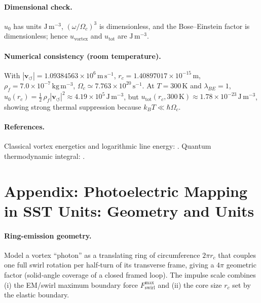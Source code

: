 \documentclass[10pt,reprint,aps,onecolumn,nofootinbib]{revtex4-2}
\begin{document}
    \paragraph{Dimensional check.}
        \(u_0\) has units \(\mathrm{J\,m^{-3}}\),
        \((\omega/\Omega_c)^3\) is dimensionless, and the Bose–Einstein factor is dimensionless; hence \(u_{\mathrm{vortex}}\) and \(u_{\mathrm{tot}}\) are \(\mathrm{J\,m^{-3}}\).

    \paragraph{Numerical consistency (room temperature).}
        With \(|\mathbf{v}_{\!\boldsymbol{\circlearrowleft}}|=1.09384563\times10^{6}\,\mathrm{m\,s^{-1}}\),
        \(r_c=1.40897017\times10^{-15}\,\mathrm{m}\),
        \(\rho_{\!f}=7.0\times10^{-7}\,\mathrm{kg\,m^{-3}}\),
        \(\Omega_c\simeq 7.763\times10^{20}\,\mathrm{s^{-1}}\).
        At \(T=300\,\mathrm{K}\) and \(\lambda_{\!BE}=1\),
        \(u_0(r_c)=\tfrac12\,\rho_{\!f}|\mathbf{v}_{\!\boldsymbol{\circlearrowleft}}|^{2}\approx 4.19\times10^{5}\,\mathrm{J\,m^{-3}}\),
        but \(u_{\mathrm{tot}}(r_c,300\,\mathrm{K})\approx 1.78\times10^{-23}\,\mathrm{J\,m^{-3}}\),
        showing strong thermal suppression because \(k_B T\ll \hbar\Omega_c\).

    \paragraph{References.}
        Classical vortex energetics and logarithmic line energy:
        \cite{Saffman1992,Batchelor1967,LandauFM}.
        Quantum thermodynamic integral: \cite{Planck1901}.


\section{Appendix: Photoelectric Mapping in SST Units: Geometry and Units}\label{app:photoelectric-sst}
    \paragraph{Ring-emission geometry.}
        Model a vortex “photon” as a translating ring of circumference \(2\pi r_c\) that couples one full swirl rotation per half‐turn of its transverse frame, giving a \(4\pi\) geometric factor (solid‐angle coverage of a closed framed loop). The impulse scale combines (i) the EM/swirl maximum boundary force \(F_{\text{swirl}}^{\max}\) and (ii) the core size \(r_c\) set by the elastic boundary.
\end{document}

